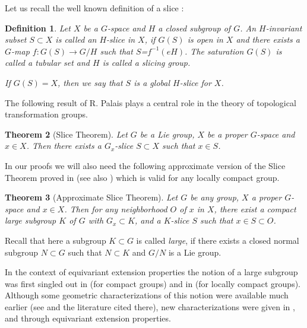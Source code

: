 \documentclass{amsart}
\newtheorem{theorem}{Theorem}[section]
\newtheorem{definition}[theorem]{Definition}
\begin{document}
\smallskip

Let us recall  the well known definition of a slice \cite[p.~305]{pal:61}:

\begin{definition}\label{D:21} Let $X$ be a $G$-space and   $H$   a closed  subgroup of $G$. An $H$-invariant  subset $S\subset X$ is called an  $H$-slice in $X$, if $G(S)$ is open in $X$ and there exists  a $G$-map $f:G(S)\to G/H$ such that $S$=$f^{-1}(eH)$.  The saturation $G(S)$ is  called   a {\it tubular} set and $H$ is called a slicing group. 

  If  $G(S)=X$, then we say that $S$ is {\it a global} $H$-slice for $X$.   
\end{definition}
\medskip

The following  result of R. Palais \cite[Proposition 2.3.1]{pal:61} plays  a central role in the theory of topological transformation groups.

\begin{theorem}[Slice Theorem]\label{T:Sl} Let $G$ be a Lie group, $X$ be a proper $G$-space and $x\in X$. Then there exists a $G_x$-slice $S\subset X$ such that $x\in S$.
\end{theorem}

In our proofs we will also need  the following approximate version of the Slice Theorem  proved in  \cite[Theorem 3.6]{ant:jap} (see also \cite[Theorem 6.1]{ant:dikr})  which is valid for any locally compact group.


\begin{theorem}[Approximate Slice Theorem] \label{T:331} Let $G$ be any group, $X$  a proper $G$-space and  $x\in X$. Then for any  neighborhood $O$ of $x$ in $X$,   there exist  a   compact  large subgroup $K$ of $G$ with $G_x\subset K$, and a $K$-slice  $S$ such that  $x\in S\subset O$. 
\end{theorem}


Recall that here a subgroup $K\subset G$ is called  {\it large}, if there exists a closed  normal subgroup $N\subset G$ such that
$N\subset K$ and $G/N$ is a Lie group.


In the context of equivariant extension properties the  notion of a  large subgroup was first singled out in \cite{ant:94} (for compact groups)  and in \cite{ant:99} (for locally compact groups). Although  some geometric characterizations of this notion were available much earlier (see \cite[Section 3]{ant:dikr} and  the literature cited there), new characterizations were given in \cite[Proposition 6]{ant:99}, \cite[Proposition 3.2]{ant:jap} and \cite[Theorem 5.3]{ant:dikr} through equivariant extension properties.
\end{document}
